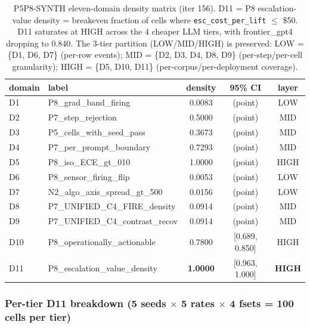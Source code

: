 \begin{table}[h]
\centering
\small
\begin{tabular}{l l c c c}
\hline
domain & label                              & density   & 95\% CI         & layer \\
\hline
D1     & P8\_grad\_band\_firing              & 0.0083    & (point)         & LOW   \\
D2     & P7\_step\_rejection                 & 0.5000    & (point)         & MID   \\
D3     & P5\_cells\_with\_seed\_pass         & 0.3673    & (point)         & MID   \\
D4     & P7\_per\_prompt\_boundary           & 0.7293    & (point)         & MID   \\
D5     & P8\_iso\_ECE\_gt\_010               & 1.0000    & (point)         & HIGH  \\
D6     & P8\_sensor\_firing\_flip            & 0.0053    & (point)         & LOW   \\
D7     & N2\_algo\_axis\_spread\_gt\_500     & 0.0156    & (point)         & LOW   \\
D8     & P7\_UNIFIED\_C4\_FIRE\_density      & 0.0914    & (point)         & MID   \\
D9     & P7\_UNIFIED\_C4\_contrast\_recov    & 0.0914    & (point)         & MID   \\
D10    & P8\_operationally\_actionable       & 0.7800    & [0.689, 0.850]  & HIGH  \\
D11    & P8\_escalation\_value\_density      & \textbf{1.0000} & [0.963, 1.000] & \textbf{HIGH} \\
\hline
\end{tabular}
\caption{P5P8-SYNTH eleven-domain density matrix (iter 156). D11 = P8
escalation-value density = breakeven fraction of cells where
\texttt{esc\_cost\_per\_lift} $\leq$ \$50. D11 saturates at HIGH
across the 4 cheaper LLM tiers, with frontier\_gpt4 dropping to
0.840. The 3-tier partition (LOW/MID/HIGH) is preserved: LOW = \{D1,
D6, D7\} (per-row events); MID = \{D2, D3, D4, D8, D9\}
(per-step/per-cell granularity); HIGH = \{D5, D10, D11\}
(per-corpus/per-deployment coverage).}
\label{tab:synth-iter156-eleven-domain}
\end{table}

\subsubsection{Per-tier D11 breakdown (5 seeds $\times$ 5 rates
$\times$ 4 fsets = 100 cells per tier)}

